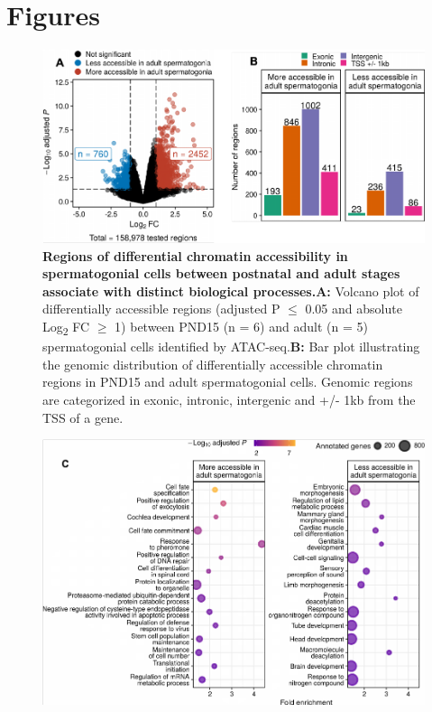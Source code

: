 \documentclass[12pt,twoside]{reedthesis}
\begin{document}
\newpage

\hypertarget{figures-1}{%
\section{Figures}\label{figures-1}}
\begin{subfigures}

\begin{figure}[htbp]

{\centering \includegraphics{thesis_files/figure-latex/df1a-1} 

}

\caption[Regions of differential chromatin accessibility in spermatogonial cells between postnatal and adult stages]{\textbf{Regions of differential chromatin accessibility in spermatogonial cells between postnatal and adult stages associate with distinct biological processes.}\newline \textbf{A:} Volcano plot of differentially accessible regions (adjusted P $\leq$ 0.05 and absolute Log\textsubscript{2} FC $\geq$ 1) between PND15 (n = 6) and adult (n = 5) spermatogonial cells identified by ATAC-seq.\newline \textbf{B:} Bar plot illustrating the genomic distribution of differentially accessible chromatin regions in PND15 and adult spermatogonial cells. Genomic regions are categorized in exonic, intronic, intergenic and +/- 1kb from the TSS of a gene.}\label{fig:df1a}
\end{figure}

\begin{figure}[htbp]

{\centering \includegraphics{thesis_files/figure-latex/df1b-1} 

}
\end{figure}
\end{subfigures}
\end{document}
